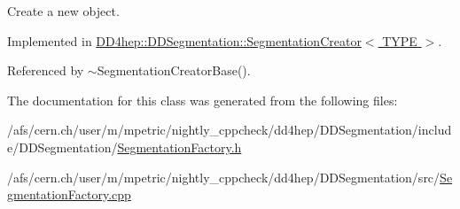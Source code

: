 Create a new object. 



Implemented in \hyperlink{class_d_d4hep_1_1_d_d_segmentation_1_1_segmentation_creator_a4d5669cfa65ace8d57f54a04af55e5e2}{D\+D4hep\+::\+D\+D\+Segmentation\+::\+Segmentation\+Creator$<$ T\+Y\+P\+E $>$}.



Referenced by $\sim$\+Segmentation\+Creator\+Base().



The documentation for this class was generated from the following files\+:\begin{DoxyCompactItemize}
\item 
/afs/cern.\+ch/user/m/mpetric/nightly\+\_\+cppcheck/dd4hep/\+D\+D\+Segmentation/include/\+D\+D\+Segmentation/\hyperlink{_segmentation_factory_8h}{Segmentation\+Factory.\+h}\item 
/afs/cern.\+ch/user/m/mpetric/nightly\+\_\+cppcheck/dd4hep/\+D\+D\+Segmentation/src/\hyperlink{_segmentation_factory_8cpp}{Segmentation\+Factory.\+cpp}\end{DoxyCompactItemize}
